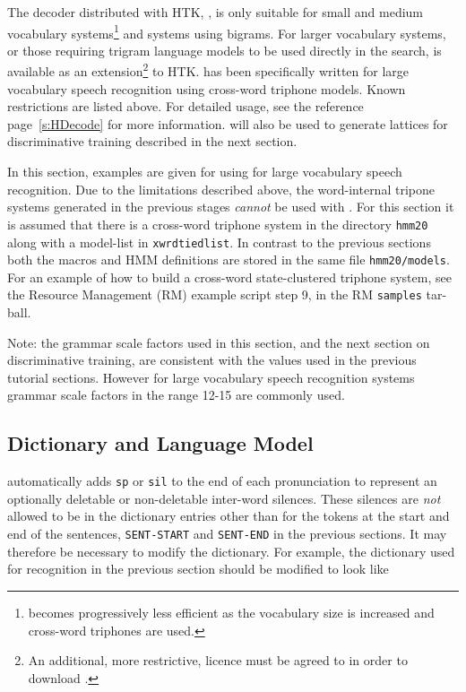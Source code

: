 The decoder distributed with HTK, , is only suitable for small
and medium vocabulary systems\footnote{ becomes progressively less
efficient as the vocabulary size is increased and cross-word triphones are used.} and systems using bigrams. For larger vocabulary systems, or
those requiring trigram language models to be used directly in the search,  is
available as an extension\footnote{An additional, more restrictive, licence
  must be agreed to in order to download .} to HTK.
 has been specifically written for large vocabulary
speech recognition using cross-word triphone models.
Known restrictions are listed above. For detailed usage, see the
 reference page~\ref{s:HDecode} for more information.  will also
be used to generate lattices for discriminative training described in the next
section. 

In this section, examples are given for using  for large vocabulary
speech recognition. Due to the limitations described above, the word-internal
tripone systems generated in the previous stages {\em cannot} be used with
. For this section it is assumed that there is a cross-word
triphone system in the directory \texttt{hmm20} along with a model-list in
{\tt xwrdtiedlist}. In contrast to the previous sections both the macros and
HMM definitions are stored in the same file \texttt{hmm20/models}. For an
example of how to build a cross-word state-clustered triphone system, see the
Resource Management (RM) example script step 9, in the RM \texttt{samples}
tar-ball.

Note: the grammar scale factors used in this section, and the next section on
discriminative training, are consistent with the values used in the previous
tutorial sections. However for large vocabulary speech recognition systems
grammar scale factors in the range 12-15 are commonly used.

\subsection{Dictionary and Language Model}

 automatically adds {\tt sp} or {\tt sil} to the end of each
pronunciation to represent an optionally deletable or non-deletable inter-word
silences. These silences are {\em not} allowed to be in the dictionary entries
other than for the tokens at the start and end of the sentences,
\texttt{SENT-START} and \texttt{SENT-END} in the previous sections. It may
therefore be necessary to modify the dictionary. For example, the dictionary used
for recognition in the previous section should be modified to look like

